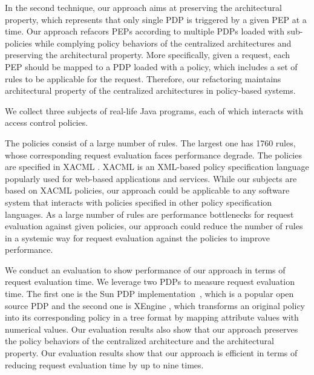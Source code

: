 In the second technique, our approach aims at preserving the architectural property, which represents that only single PDP is triggered by a given PEP at a time.
Our approach refacors PEPs according to multiple PDPs loaded with sub-policies while complying policy behaviors of the centralized architectures
and preserving the architectural property. More specifically, given a request, each PEP should be mapped to a PDP loaded with a policy, 
which includes a set of rules to be applicable for the request.
Therefore, our refactoring maintains architectural property of the centralized architectures in policy-based systems.







We collect three subjects of real-life Java programs, each of which interacts
with access control policies.

The policies consist of a large number of rules. The largest one has 1760 rules, whose corresponding request evaluation faces performance degrade.
The policies are specified in XACML \cite{xacml}.
XACML is an XML-based policy specification language popularly used for web-based applications and services.
While our subjects are based on XACML policies,
our approach could be
applicable to any software system that interacts with policies specified in other
policy specification languages. As a large number of rules are performance bottlenecks for request evaluation
against given policies, our approach could reduce the number of rules in a systemic way for request evaluation against the policies to improve performance.



We conduct an evaluation to show performance of our approach in terms of request evaluation time.
We leverage two PDPs to measure request evaluation time. The first one is the
Sun PDP implementation~\cite{oasis}, which is a popular open source PDP and the second one is
XEngine \cite{Xengine}, which transforms an original policy
into its corresponding policy in a tree format by mapping attribute values with numerical values.
Our evaluation results also show that our approach
preserves the policy behaviors of the centralized architecture and the architectural property. Our evaluation results show that our approach
is efficient in terms of reducing request evaluation time by up to nine times.


